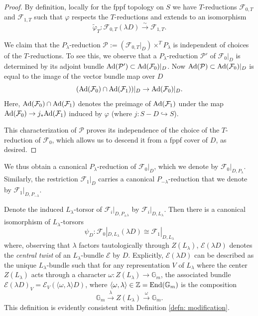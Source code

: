 \documentclass[reqno]{amsart}
\numberwithin{equation}{subsection}
\theoremstyle{definition}
\newcommand{\TF}[1]{{\color{ForestGreen}{#1}}}
\def\GG{\mathbb{G}}
\def\ZZ{\mathbb{Z}}
\newcommand\cE{\mathcal{E}}
\newcommand\cF{\mathcal{F}}
\newcommand\cP{\mathcal{P}}
\newcommand\frg{\mathfrak{g}}
\newcommand\End{\textup{End}}
\newcommand{\Gm}{\GG_m}
\newcommand{\Ad}{\textup{Ad}}
\renewcommand{\j}[1]{\langle{#1}\rangle}
\newcommand{\wt}[1]{\widetilde{#1}}
\newcommand{\incl}{\hookrightarrow}
\newcommand{\isom}{\stackrel{\sim}{\to}}
\newcommand\xr{\xrightarrow}
\newcommand{\ph}{\varphi}
\renewcommand{\l}{\lambda}
\newcommand{\om}{\omega}
\newcommand\Yun[1]{{\color{red} Y:#1}}
\newcommand\mnote[1]{\marginpar{\tiny #1}}
\begin{document}
\begin{proof} By definition, locally for the fppf topology on $S$ we have $T$-reductions $\cF_{0,T}$ and $\cF_{1,T}$ such that $\ph$ respects the $T$-reductions and extends to an isomorphism 
\[
\wt\ph_{T}: \cF_{0,T}(\l D)\isom \cF_{1,T}.
\]

We claim that the $P_{\l}$-reduction $\cP:=(\cF_{0,T}|_{D})\times^{T}P_{\l}$ is independent of choices of the $T$-reductions. To see this, we observe that a $P_\l$-reduction $\cP'$ of $\cF_{0}|_D$ is determined by its adjoint bundle $\Ad(\cP')\subset \Ad(\cF_0)|_D$. Now $\Ad(\cP)\subset \Ad(\cF_0)|_D$ is equal to the image of the vector bundle map over $D$
\begin{equation*}
(\Ad(\cF_{0})\cap \Ad(\cF_1))|_{D}\to \Ad(\cF_{0})|_{D}.
\end{equation*}
Here, $\Ad(\cF_{0})\cap \Ad(\cF_1)$ denotes the preimage of $\Ad(\cF_1)$ under the map $\Ad(\cF_0)\to j_*\Ad(\cF_1)$ induced by $\ph$ (where $j:S-D\incl S$).


This characterization of $\cP$ proves its independence of the choice of the $T$-reduction of $\cF_0$, which allows us to descend it from a fppf cover of $D$, as desired. 

\end{proof}
  
We thus obtain a canonical $P_{\l}$-reduction of $\cF_{0}|_{D}$, which we denote by $\cF_{0}|_{D, P_{\l}}$. Similarly, the restriction $\cF_{1}|_{D}$ carries a canonical $P_{-\l}$-reduction that we denote by $\cF_{1}|_{D, P_{-\l}}$. 

Denote the induced $L_{\l}$-torsor of $\cF_{i}|_{D,P_{\pm \l}}$ by $\cF_{i}|_{D,L_{\l}}$. Then there is a canonical isomorphism of $L_{\l}$-torsors 
\begin{equation}\label{psi D}
\psi_{D}: \cF_{0}|_{D,L_{\l}}(\l D)\cong \cF_{1}|_{D,L_{\l}}
\end{equation}
where, observing that $\lambda$ factors tautologically through $Z(L_\lambda)$, $\cE(\l D)$ denotes the \emph{central twist} of an $L_{\l}$-bundle $\cE$ by $D$. Explicitly, $\cE(\l D)$ can be described as the unique $L_{\l}$-bundle such that for any representation $V$ of $L_{\l}$ where the center $Z(L_{\l})$ acts through a character $\om:Z(L_{\l})\to \Gm$, the associated bundle $\cE(\l D)_{V}=\cE_{V}(\j{\om,\l}D)$, where $\j{\om, \l}\in \ZZ=\End(\Gm)$ is the composition 
\[
\Gm\xr{\l}Z(L_{\l})\xr{\om}\Gm.
\]
This definition is evidently consistent with  Definition \ref{defn: modification}. 
\end{document}
